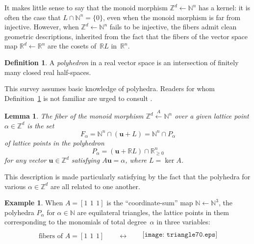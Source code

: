 \documentclass[12pt]{amsart}
\numberwithin{equation}{section}
\newtheorem{lemma}[thm]{Lemma}
\theoremstyle{definition}
\newtheorem{defn}[thm]{Definition}
\newtheorem{example}[thm]{Example}
\begin{document}
It makes little sense to say that the monoid morphism ${\mathbb{Z}}^d {\leftarrow}
{\mathbb{N}}^n$ has a kernel: it is often the case that $L \cap {\mathbb{N}}^n = \{0\}$,
even when the monoid morphism is far from injective.  However, when
${\mathbb{Z}}^d {\leftarrow} {\mathbb{N}}^n$ fails to be injective, the fibers admit clean
geometric descriptions, inherited from the fact that the fibers of the
vector space map ${\mathbb{R}}^d {\leftarrow} {\mathbb{R}}^n$ are the cosets of~${\mathbb{R}} L$
in~${\mathbb{R}}^n$.

\begin{defn}\label{d:polyhedron}
A \emph{polyhedron} in a real vector space is an intersection of
finitely many closed real half-spaces.  
\end{defn}

This survey assumes basic knowledge of polyhedra.  Readers for whom
Definition~\ref{d:polyhedron} is not familiar are urged to consult
\cite[Chapters~0, 1, and~2]{ziegler}.

\begin{lemma}\label{l:fiber}
The fiber of the monoid morphism ${\mathbb{Z}}^d \stackrel A{\leftarrow} {\mathbb{N}}^n$ over a
given lattice point $\alpha \in {\mathbb{Z}}^d$ is the set
$$  F_\alpha = {\mathbb{N}}^n \cap ({\mathbf{u}} + L) = {\mathbb{N}}^n \cap P_\alpha
$$of lattice points in the polyhedron
$$  P_\alpha = ({\mathbf{u}} + {\mathbb{R}} L) \cap {\mathbb{R}}^n_{\geq 0}
$$
for any vector ${\mathbf{u}} \in {\mathbb{Z}}^d$ satisfying $A{\mathbf{u}} = \alpha$, where $L =
\ker A$.
\end{lemma}

This description is made particularly satisfying by the fact that the
polyhedra for various $\alpha \in {\mathbb{Z}}^d$ are all related to one
another.

\begin{example}\label{e:triangles}
When $A = [1\ \,1\ \,1]$ is the ``coordinate-sum'' map ${\mathbb{N}} {\leftarrow}
{\mathbb{N}}^3$, the polyhedra $P_\alpha$ for $\alpha \in {\mathbb{N}}$ are equilateral
triangles, the lattice points in them corresponding to the monomials
of total degree~$\alpha$ in three variables:
$$\begin{array}{cc}
  \begin{array}{c}
    \\
    \text{fibers of } A = [1\ \,1\ \,1]
    \qquad\longleftrightarrow\ \
  \end{array}
&
  \begin{array}{c}\texttt{[image: triangle70.eps]}\end{array}
\end{array}
$$
\end{example}
\end{document}

